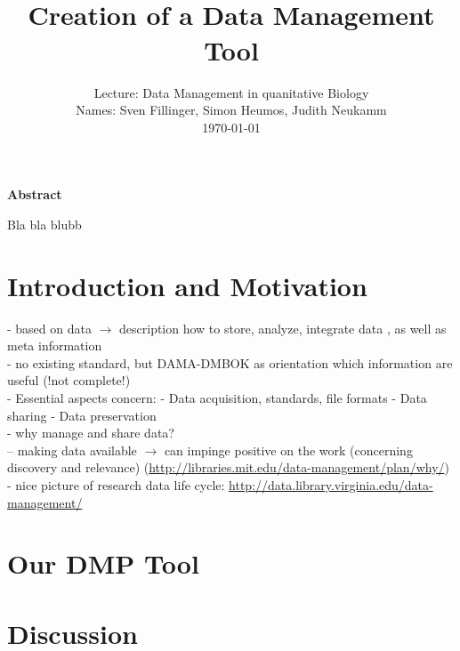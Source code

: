 \documentclass[paper=a4, fontsize=11pt]{scrartcl}	%
\title{
		\usefont{OT1}{bch}{b}{n}
		\horrule{0.5pt} \\[0.4cm]
		\LARGE Creation of a Data Management Tool
		\horrule{2pt} \\%
}
\author{
		\normalfont 								\normalsize
			Lecture: Data Management in quanitative Biology\\					\normalsize
     		Names: Sven Fillinger, Simon Heumos, Judith Neukamm\\					\normalsize
       		 \today
}
\date{}
\numberwithin{equation}{section}		%
\numberwithin{figure}{section}			%
\numberwithin{table}{section}				%
\begin{document}
\maketitle

\centerline{\bf Abstract}
Bla bla blubb
\noindent

\newpage

\section{Introduction and Motivation}
- based on data $\rightarrow$ description how to store, analyze, integrate data \cite{lecture}, as well as meta information\\
- no existing standard, but DAMA-DMBOK as orientation which information are useful (!not complete!)\cite{lecture}\\
- Essential aspects concern: - Data acquisition, standards, file formats  - Data sharing - Data preservation \cite{lecture}\\
- why manage and share data?\\
-- making data available $\rightarrow$ can impinge positive on the work (concerning discovery and relevance) (\url{http://libraries.mit.edu/data-management/plan/why/})\\
- nice picture of research data life cycle: \url{http://data.library.virginia.edu/data-management/} 

\section{Our DMP Tool}

\section{Discussion}



\newpage


\end{document}
